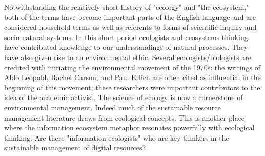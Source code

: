  Notwithstanding the relatively short history of "ecology" and "the ecosystem," both of the terms have become important parts of the English language and are considered household terms as well as referents to forms of scientific inquiry and socio-natural systems. In this short period ecologists and ecosystems thinking have contributed knowledge to our understandings of natural processes. They have also given rise to an environmental ethic. Several ecologists/biologists are credited with initiating the environmental movement of the 1970s: the writings of Aldo Leopold, Rachel Carson, and Paul Erlich are often cited as influential in the beginning of this movement; these researchers were important contributors to the idea of the academic activist. The science of ecology is now a cornerstone of environmental management. Indeed much of the sustainable resource management literature draws from ecological concepts. This is another place where the information ecosystem metaphor resonates powerfully with ecological thinking. Are there "information ecologists" who are key thinkers in the sustainable management of digital resources? 